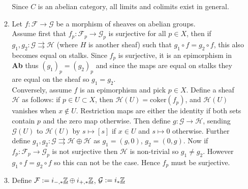 \documentclass[10pt,a4paper]{article}
\begin{document}
\begin{enumerate}
\begin{enumerate}
Since $C$ is an abelian category, all limits and colimits exist in general.
\item Let $f:\mathcal{F}\to \mathcal{G}$ be a morphism of sheaves on abelian groups. \\
Assume first that $f_p:\mathcal{F}_p\to \mathcal{G}_p$ is surjective for all $p\in X$, then if $g_1,g_2:\mathcal{G}\rightrightarrows\mathcal{H}$ (where $H$ is another sheaf) such that $g_1\circ f = g_2\circ f$, this also becomes equal on stalks. Since $f_p$ is surjective, it is an epimorphism in \textbf{Ab} thus $(g_1)_p = (g_2)_p$ and since the maps are equal on stalks they are equal on the sheaf so $g_1=g_2$.\\
Conversely, assume $f$ is an epimorphism and pick $p\in X$. Define a sheaf $\mathcal{H}$ as follows: if $p\in U \subset X$, then $\mathcal{H}(U) = \text{coker}(f_p)$, and $\mathcal{H}(U)$ vanishes when $x\not\in U$. Restriction maps are either the identity if both sets contain $p$ and the zero map otherwise. Then define $g:\mathcal{G}\to \mathcal{H}$, sending $\mathcal{G}(U)$ to $\mathcal{H}(U)$ by $s\mapsto [s]$ if $x\in U$ and $s\mapsto 0$ otherwise. Further define $g_1,g_2:\mathcal{G}\rightrightarrows \mathcal{H}\oplus\mathcal{H}$ as $g_1 = (g,0)$, $g_2 = (0,g)$. Now if $f_p:\mathcal{F}_p\to \mathcal{G}_p$ is not surjective then $\mathcal{H}$ is non-trivial so $g_1\neq g_2$. However $g_1\circ f = g_2\circ f$ so this can not be the case. Hence $f_p$ must be surjective.
\item Define $\mathcal{F}:= i_{-,*}\underline{\mathbb{Z}}\oplus i_{+,*}\underline{\mathbb{Z}}$, $\mathcal{G}:=i_*\underline{\mathbb{Z}}$
\end{enumerate}
\end{enumerate}
\end{document}
